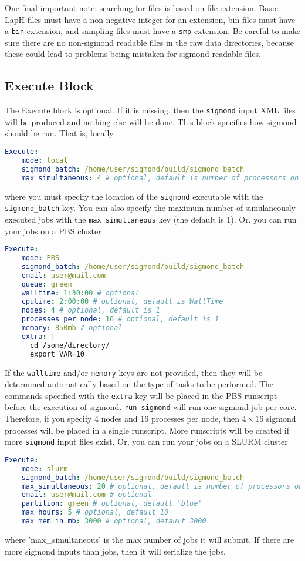 \documentclass[12pt,letterpaper,notitlepage]{article}
\newcommand{\key}[1]{\textcolor{Emerald}{\texttt{\small{#1}}}}
\newcommand{\runsigmond}{\texttt{run-sigmond}}
\newcommand{\sigmond}{\texttt{sigmond}}
\begin{document}
One final important note: searching for files is based on file extension.
Basic LapH files must have a non-negative integer for an extension,
bin files must have a \texttt{bin} extension,
and sampling files must have a \texttt{smp} extension.
Be careful to make sure there are no non-sigmond readable files in the raw data directories,
because these could lead to problems being mistaken for sigmond readable files.

\subsection{Execute Block}

The Execute block is optional. If it is missing, then the \sigmond{} input \textsc{XML} files will be produced and nothing else will be done.
This block specifies how sigmond should be run. That is, locally
\begin{lstlisting}[language=yaml]
  Execute:
    mode: local
    sigmond_batch: /home/user/sigmond/build/sigmond_batch
    max_simultaneous: 4 # optional, default is number of processors on machine
\end{lstlisting}
where you must specify the location of the \sigmond{} executable with the \key{sigmond\_batch} key.
You can also specify the maximum number of simulaneously executed jobs with the \key{max\_simultaneous} key (the default is 1).
Or, you can run your jobs on a PBS cluster
\begin{lstlisting}[language=yaml]
  Execute:
    mode: PBS
    sigmond_batch: /home/user/sigmond/build/sigmond_batch
    email: user@mail.com
    queue: green
    walltime: 1:30:00 # optional
    cputime: 2:00:00 # optional, default is WallTime
    nodes: 4 # optional, default is 1
    processes_per_node: 16 # optional, default is 1
    memory: 850mb # optional
    extra: |
      cd /some/directory/
      export VAR=10
\end{lstlisting}
If the \key{walltime} and/or \key{memory} keys are not provided, then they will be determined automatically based on the type of tasks to be performed.
The commands specified with the \key{extra} key will be placed in the PBS runscript before the execution of sigmond.
\runsigmond{} will run one sigmond job per core.
Therefore, if you specify 4 nodes and 16 processes per node, then $4 \times 16$ sigmond processes will be placed in a single runscript.
More runscripts will be created if more \sigmond{} input files exist.
Or, you can run your jobs on a SLURM cluster
\begin{lstlisting}[language=yaml]
  Execute:
    mode: slurm
    sigmond_batch: /home/user/sigmond/build/sigmond_batch
    max_simultaneous: 20 # optional, default is number of processors on machine
    email: user@mail.com # optional
    partition: green # optional, default 'blue'
    max_hours: 5 # optional, default 10
    max_mem_in_mb: 3000 # optional, default 3000
\end{lstlisting}
where 'max_simultaneous' is the max number of jobs it will submit. If there are more sigmond inputs than jobs, then it will serialize the jobs. 
\end{document}
